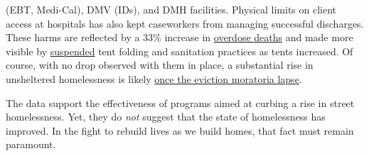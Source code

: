 \documentclass[11pt]{article}
\begin{document}
(EBT, Medi-Cal), DMV (IDs), and DMH facilities. Physical limits on client access at 
hospitals has also kept caseworkers from managing successful discharges. These harms 
are reflected by a 33\% increase in 
\href{http://publichealth.lacounty.gov/chie/reports/HomelessMortality2020_CHIEBrief_Final.pdf}{overdose deaths} and made more visible by \href{https://clkrep.lacity.org/onlinedocs/2020/20-0147_misc_3-17-20_p.pdf}{suspended}
tent folding and sanitation practices as tents increased.
Of course, with no drop observed with them in place, a substantial rise in unsheltered homelessness
is likely \href{https://www.latimes.com/california/story/2021-01-12/new-report-foresees-tens-of-thousands-losing-homes-by-2023}{once the eviction moratoria lapse}.

The data support the effectiveness of programs aimed at curbing a rise in street homelessness.
Yet, they do {\it not} suggest that the state of homelessness has improved. In the fight to rebuild 
lives as we build homes, that fact must remain paramount.

\end{document}
